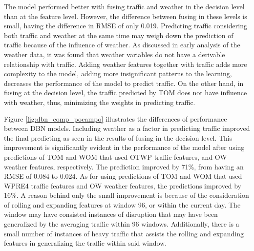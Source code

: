 The model performed better with fusing traffic and weather in the decision level than at the feature level. However, the difference between fusing in these levels is small, having the difference in RMSE of only 0.019. Predicting traffic considering both traffic and weather at the same time may weigh down the prediction of traffic because of the influence of weather. As discussed in early analysis of the weather data, it was found that weather variables do not have a derivable relationship with traffic. Adding weather features together with traffic adds more complexity to the model, adding more insignificant patterns to the learning, decreases the performance of the model to predict traffic. On the other hand, in fusing at the decision level, the traffic predicted by TOM does not have influence with weather, thus, minimizing the weights in predicting traffic. 

Figure \ref{fig:dbn_comp_pocampo} illustrates the differences of performance between DBN models. Including weather as a factor in predicting traffic improved the final predicting as seen in the results of fusing in the decision level. This improvement is significantly evident in the performance of the model after using predictions of TOM and WOM that used OTWP traffic features, and OW weather features, respectively. The prediction improved by 71\%, from having an RMSE of 0.084 to 0.024. As for using predictions of TOM and WOM that used WPRE4 traffic features and OW weather features, the predictions improved by 16\%. A reason behind only the small improvement is because of the consideration of rolling and expanding features at window 96, or within the current day. The window may have consisted instances of disruption that may have been generalized by the averaging traffic within 96 windows. Additionally, there is a small number of instances of heavy traffic that assists the rolling and expanding features in generalizing the traffic within said window. 

